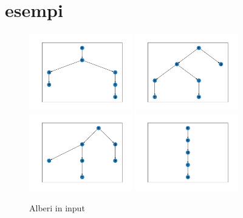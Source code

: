 \documentclass{article}
\begin{document}
\section*{esempi}

\begin{figure}[H]
    \centering
    \includegraphics[width=0.4\textwidth]{Resources/T1.png}
    \hspace{0.5cm}
    \includegraphics[width=0.4\textwidth]{Resources/T2.png}
    \hspace{0.5cm}
    \includegraphics[width=0.4\textwidth]{Resources/T3.png}
    \hspace{0.5cm}
    \includegraphics[width=0.4\textwidth]{Resources/T4.png}
    \caption{Alberi in input}
\end{figure}
\end{document}
